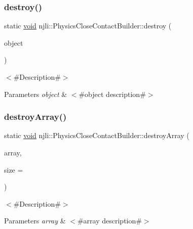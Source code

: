 \subsubsection{\texorpdfstring{destroy()}{destroy()}}
{\footnotesize\ttfamily static \mbox{\hyperlink{_thread_8h_af1e856da2e658414cb2456cb6f7ebc66}{void}} njli\+::\+Physics\+Close\+Contact\+Builder\+::destroy (\begin{DoxyParamCaption}\item[{\mbox{\hyperlink{classnjli_1_1_physics_close_contact_builder}{Physics\+Close\+Contact\+Builder}} $\ast$}]{object }\end{DoxyParamCaption})\hspace{0.3cm}{\ttfamily [static]}}

$<$\#\+Description\#$>$


\begin{DoxyParams}{Parameters}
{\em object} & $<$\#object description\#$>$ \\
\hline
\end{DoxyParams}
\mbox{\label{classnjli_1_1_physics_close_contact_builder_abe100858f28e115edef5b0605ae4b669}} 
\subsubsection{\texorpdfstring{destroy\+Array()}{destroyArray()}}
{\footnotesize\ttfamily static \mbox{\hyperlink{_thread_8h_af1e856da2e658414cb2456cb6f7ebc66}{void}} njli\+::\+Physics\+Close\+Contact\+Builder\+::destroy\+Array (\begin{DoxyParamCaption}\item[{\mbox{\hyperlink{classnjli_1_1_physics_close_contact_builder}{Physics\+Close\+Contact\+Builder}} $\ast$$\ast$}]{array,  }\item[{const \mbox{\hyperlink{_util_8h_a10e94b422ef0c20dcdec20d31a1f5049}{u32}}}]{size = {} }\end{DoxyParamCaption})\hspace{0.3cm}{\ttfamily [static]}}

$<$\#\+Description\#$>$


\begin{DoxyParams}{Parameters}
{\em array} & $<$\#array description\#$>$ \\
\hline
\end{DoxyParams}
\mbox{\label{classnjli_1_1_physics_close_contact_builder_a6f71bf92547966206aa4f9ad705b934d}} 
